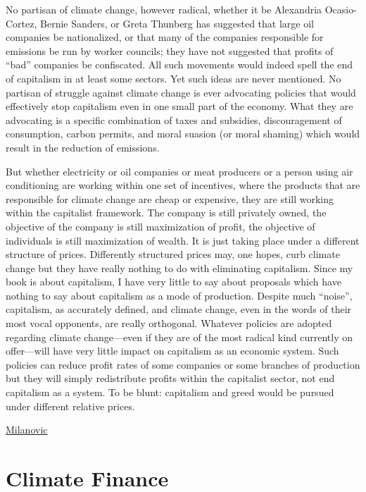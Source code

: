 \documentclass[
]{book}
\begin{document}
No partisan of climate change, however radical, whether it be Alexandria Ocasio-Cortez, Bernie Sanders, or Greta Thunberg has suggested that large oil companies be nationalized, or that many of the companies responsible for emissions be run by worker councils; they have not suggested that profits of ``bad'' companies be confiscated. All such movements would indeed spell the end of capitalism in at least some sectors. Yet such ideas are never mentioned. No partisan of struggle against climate change is ever advocating policies that would effectively stop capitalism even in one small part of the economy. What they are advocating is a specific combination of taxes and subsidies, discouragement of consumption, carbon permits, and moral suasion (or moral shaming) which would result in the reduction of emissions.

But whether electricity or oil companies or meat producers or a person using air conditioning are working within one set of incentives, where the products that are responsible for climate change are cheap or expensive, they are still working within the capitalist framework. The company is still privately owned, the objective of the company is still maximization of profit, the objective of individuals is still maximization of wealth. It is just taking place under a different structure of prices. Differently structured prices may, one hopes, curb climate change but they have really nothing to do with eliminating capitalism. Since my book is about capitalism, I have very little to say about proposals which have nothing to say about capitalism as a mode of production. Despite much ``noise'', capitalism, as accurately defined, and climate change, even in the words of their most vocal opponents, are really orthogonal. Whatever policies are adopted regarding climate change---even if they are of the most radical kind currently on offer---will have very little impact on capitalism as an economic system. Such policies can reduce profit rates of some companies or some branches of production but they will simply redistribute profits within the capitalist sector, not end capitalism as a system. To be blunt: capitalism and greed would be pursued under different relative prices.

\href{http://glineq.blogspot.com/2021/05/capital-gains-my-reply-to-alyssa.html}{Milanovic}

\hypertarget{climate-finance}{%
\chapter{Climate Finance}\label{climate-finance}}
\end{document}
